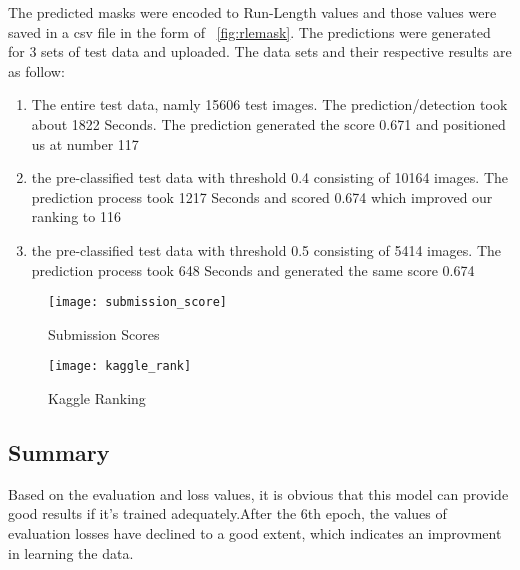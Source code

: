 The predicted masks were encoded to Run-Length values and those values were saved in a csv file in the form of ~\ref{fig:rlemask}. 
The predictions were generated for 3 sets of test data and uploaded. The data sets and their respective results are as follow:  
\begin{enumerate}
  \item The entire test data, namly 15606 test images. The prediction/detection took about 1822 Seconds. The prediction generated the score 0.671 and positioned us at number 117
  \item the pre-classified test data with threshold 0.4 consisting of 10164 images. The prediction process took 1217 Seconds and scored 0.674 which improved our ranking to 116
  \item the pre-classified test data with threshold 0.5 consisting of 5414 images. The prediction process took 648 Seconds and generated the same score 0.674
\end{enumerate}

\begin{figure}[h!]
  \centering
  \texttt{[image: submission\_score]}
  \caption[Submission Scores]
   {Submission Scores}
   \label{fig:scores}
\end{figure}

\begin{figure}[h!]
  \centering
  \texttt{[image: kaggle\_rank]}
  \caption[Kaggle Ranking]
   {Kaggle Ranking}
   \label{fig:rank}
\end{figure}


\subsection{Summary}
\label{subsec:sum}

Based on the evaluation and loss values, it is obvious that this model can provide good results if it's trained adequately.After the 6th epoch, the values of evaluation losses have declined to a good extent, which indicates an improvment in learning the data.
































